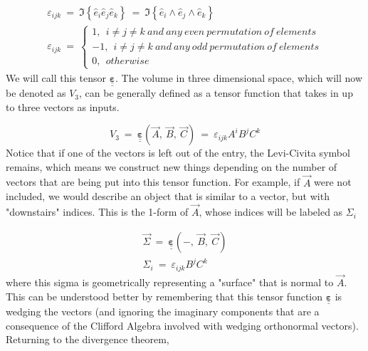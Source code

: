 \begin{equation}
  \begin{gathered}
    \varepsilon_{ijk}\ =\ \Im\left \{ \hat{e}_i\hat{e}_j\hat{e}_k\right \}\ =\
    \Im\left \{ \hat{e}_i\wedge\hat{e}_j\wedge\hat{e}_k\right \} \\
    \varepsilon_{ijk}\ =\
    \begin{cases}
      1,\ \ i\neq j\neq k\ \mathit{and\ any\ even\ permutation\ of\ elements}\\
      -1,\ \ i\neq j\neq k\ \mathit{and\ any\ odd\ permutation\ of\ elements}\\
      0,\ \ \mathit{otherwise}
    \end{cases}
  \end{gathered}
\end{equation}
We will call this tensor $\underline{\underline{\mathbf{\varepsilon}}}$.  The volume in three dimensional space, which will now be denoted as $V_3$, can be generally defined as a tensor function that takes in up to three vectors as inputs.

\begin{equation}
  V_3\ =\ \underline{\underline{\mathbf{\varepsilon}}}\left (\vec{A},\ \vec{B},\ \vec{C}\right )\ =\
  \varepsilon_{ijk}A^iB^jC^k
\end{equation}
Notice that if one of the vectors is left out of the entry, the Levi-Civita symbol remains, which means we construct new things depending on the number of vectors that are being put into this tensor function.  For example, if $\vec{A}$ were not included, we would describe an object that is similar to a vector, but with "downstairs" indices.  This is the 1-form of $\vec{A}$, whose indices will be labeled as $\Sigma_i$

\begin{equation}
  \begin{gathered}
    \vec{\Sigma}\ =\ \underline{\underline{\mathbf{\varepsilon}}}\left (-,\ \vec{B},\ \vec{C}\right ) \\
    \Sigma_i\ =\ \varepsilon_{ijk}B^jC^k
  \end{gathered}
\end{equation}
where this sigma is geometrically representing a "surface" that is normal to $\vec{A}$.  This can be understood better by remembering that this tensor function $\underline{\underline{\mathbf{\varepsilon}}}$ is wedging the vectors (and ignoring the imaginary components that are a consequence of the Clifford Algebra involved with wedging orthonormal vectors).  Returning to the divergence theorem,

